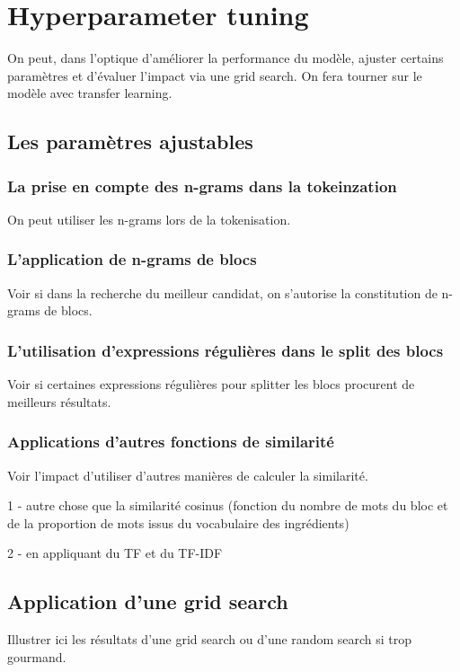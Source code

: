     \chapter{Hyperparameter tuning}
            
    On peut, dans l'optique d'améliorer la performance du modèle, ajuster certains paramètres et d'évaluer l'impact via une grid search.
    On fera tourner sur le modèle avec transfer learning.

        \section{Les paramètres ajustables}

            \subsection{La prise en compte des \og n-grams \fg dans la tokeinzation}

            On peut utiliser les n-grams lors de la tokenisation.

            \subsection{L'application de \og n-grams \fg de blocs}

            Voir si dans la recherche du meilleur candidat, on s'autorise la constitution de \og n-grams \fg de blocs.

            \subsection{L'utilisation d'expressions régulières dans le split des blocs}

            Voir si certaines expressions régulières pour splitter les blocs procurent de meilleurs résultats.

            \subsection{Applications d'autres fonctions de similarité}

            Voir l'impact d'utiliser d'autres manières de calculer la similarité.

            1 - autre chose que la similarité cosinus (fonction du nombre de mots du bloc et de la proportion de mots issus du vocabulaire des ingrédients)

            2 - en appliquant du TF et du TF-IDF

        \section{Application d'une grid search}

        Illustrer ici les résultats d'une grid search ou d'une random search si trop gourmand.